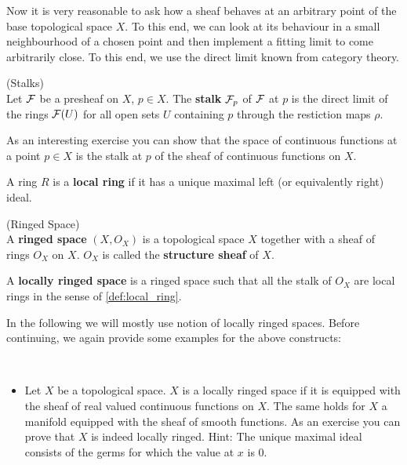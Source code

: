 Now it is very reasonable to ask how a sheaf behaves at an arbitrary point of the base topological space $X$. To this end, we can look at its behaviour in a small neighbourhood of a chosen point and then implement a fitting limit to come arbitrarily close. To this end, we use the direct limit known from category theory.

\begin{definition} (Stalks)\\
  Let ${\mathcal{F}}$ be a presheaf on $X$, $p \in X$. The \textbf{stalk} ${\mathcal{F}}_p$ of ${\mathcal{F}}$ at $p$ is the direct limit of the rings ${\mathcal{F}}(U)$ for all open sets $U$ containing $p$ through the restiction maps $\rho$.
\end{definition}


\begin{ex}
  As an interesting exercise you can show that the space of continuous functions at a point $p \in X$ is the stalk at $p$ of the sheaf of continuous functions on $X$.
\end{ex}

\begin{definition}
\label{def:local_ring}
  A ring $R$ is a \textbf{local ring} if it has a unique maximal left (or equivalently right) ideal.
\end{definition}

\begin{definition} (Ringed Space)\\
  A \textbf{ringed space} $(X, O_X)$ is a topological space $X$ together with a sheaf of rings $O_X$ on $X$. $O_X$ is called the \textbf{structure sheaf} of $X$.
\end{definition}

\begin{definition}
  A \textbf{locally ringed space} is a ringed space such that all the stalk of $O_X$ are local rings in the sense of \ref{def:local_ring}.
\end{definition}

In the following we will mostly use notion of locally ringed spaces. Before continuing, we again provide some examples for the above constructs:

\begin{example}~
  \begin{itemize}
    \item Let $X$ be a topological space. $X$ is a locally ringed space if it is equipped with the sheaf of real valued continuous functions on $X$. The same holds for $X$ a manifold equipped with the sheaf of smooth functions. As an exercise you can prove that $X$ is indeed locally ringed. Hint: The unique maximal ideal consists of the germs for which the value at $x$ is $0$.
  \end{itemize}
\end{example}

